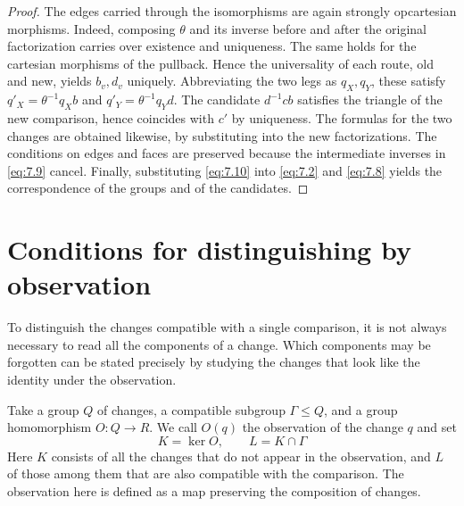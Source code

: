 \begin{proof}

The edges carried through the isomorphisms are again strongly opcartesian morphisms.
Indeed, composing $\theta$ and its inverse before and after the original factorization
carries over existence and uniqueness.
The same holds for the cartesian morphisms of the pullback.
Hence the universality of each route, old and new, yields $b_v,d_v$ uniquely.
Abbreviating the two legs as $q_X,q_Y$, these satisfy
$q'_X=\theta^{-1}q_Xb$ and $q'_Y=\theta^{-1}q_Yd$.
The candidate $d^{-1}cb$ satisfies the triangle of the new comparison, hence coincides with
$c'$ by uniqueness.
The formulas for the two changes are obtained likewise, by substituting into the new
factorizations.
The conditions on edges and faces are preserved because the intermediate inverses in
\eqref{eq:7.9} cancel.
Finally, substituting \eqref{eq:7.10} into \eqref{eq:7.2} and \eqref{eq:7.8} yields the
correspondence of the groups and of the candidates.

\end{proof}

\section{Conditions for distinguishing by observation}\label{sec:7.3}

To distinguish the changes compatible with a single comparison, it is not always necessary
to read all the components of a change.
Which components may be forgotten can be stated precisely by studying the changes that look
like the identity under the observation.

\begin{definition}\label{def:7.8}

Take a group $Q$ of changes, a compatible subgroup $\Gamma\le Q$, and a group homomorphism
$O:Q\to R$.
We call $O(q)$ the observation of the change $q$ and set
\begin{equation*}
K=\ker O,\qquad L=K\cap\Gamma
\tag{7.11}\label{eq:7.11}
\end{equation*}
Here $K$ consists of all the changes that do not appear in the observation, and $L$ of
those among them that are also compatible with the comparison.
The observation here is defined as a map preserving the composition of changes.

\end{definition}

